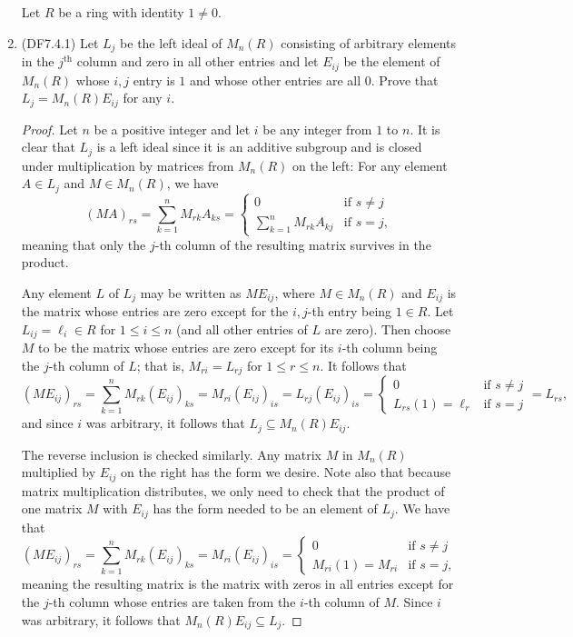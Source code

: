 \documentclass[11pt]{article}
\begin{document}
\begin{enumerate}
    Let $R$ be a ring with identity $1\neq 0$.
    \item (DF7.4.1) Let $L_j$ be the left ideal of $M_n(R)$ consisting of arbitrary elements in the $j^{\text{th}}$ column and zero in all other entries and let $E_{ij}$ be the element of $M_n(R)$ whose $i,j$ entry is $1$ and whose other entries are all $0$. Prove that $L_j = M_n(R)E_{ij}$ for any $i$.
    \begin{proof}
      Let $n$ be a positive integer and let $i$ be any integer from $1$ to $n$. It is clear that $L_j$ is a left ideal since it is an additive subgroup and is closed under multiplication by matrices from $M_n(R)$ on the left: For any element $A \in L_j$ and $M\in M_n(R)$, we have \[(MA)_{rs} = \sum_{k=1}^n M_{rk}A_{ks} =  \begin{cases}
        0 &\text{if $s\neq j$}\\
        \sum_{k=1}^n M_{rk}A_{kj} &\text{if $s = j$},
      \end{cases}\] meaning that only the $j$-th column of the resulting matrix survives in the product.

      Any element $L$ of $L_j$ may be written as $ME_{ij}$, where $M\in M_n(R)$ and $E_{ij}$ is the matrix whose entries are zero except for the $i,j$-th entry being $1\in R$. Let $L_{ij} = \ell_i\in R$ for $1\leq i\leq n$ (and all other entries of $L$ are zero). Then choose $M$ to be the matrix whose entries are zero except for its $i$-th column being the $j$-th column of $L$; that is, $M_{ri} = L_{rj}$ for $1\leq r \leq n$. It follows that \[(ME_{ij})_{rs} = \sum_{k=1}^n M_{rk}(E_{ij})_{ks} = M_{ri}(E_{ij})_{is} = L_{rj}(E_{ij})_{is} = \begin{cases}
        0 &\text{if $s\neq j$}\\
        L_{rs}(1) = \ell_r &\text{if $s = j$}
      \end{cases} = L_{rs},\] and since $i$ was arbitrary, it follows that $L_j\subseteq M_n(R)E_{ij}$.

      The reverse inclusion is checked similarly. Any matrix $M$ in $M_n(R)$ multiplied by $E_{ij}$ on the right has the form we desire. Note also that because matrix multiplication distributes, we only need to check that the product of one matrix $M$ with $E_{ij}$ has the form needed to be an element of $L_j$. We have that \[(ME_{ij})_{rs} = \sum_{k=1}^n M_{rk}(E_{ij})_{ks} = M_{ri}(E_{ij})_{is} =\begin{cases}
        0 &\text{if $s\neq j$}\\
        M_{ri}(1) = M_{ri} &\text{if $s = j$},
      \end{cases}\] meaning the resulting matrix is the matrix with zeros in all entries except for the $j$-th column whose entries are taken from the $i$-th column of $M$. Since $i$ was arbitrary, it follows that $M_n(R)E_{ij}\subseteq L_j$. 


\end{proof}
\end{enumerate}
\end{document}
